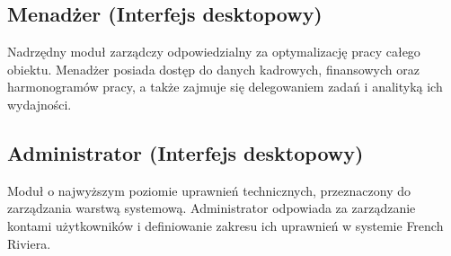 \subsection{Menadżer (Interfejs desktopowy)}
Nadrzędny moduł zarządczy odpowiedzialny za optymalizację pracy całego obiektu. Menadżer posiada dostęp do danych kadrowych, finansowych oraz harmonogramów pracy, a także zajmuje się delegowaniem zadań i analityką ich wydajności.

\subsection{Administrator (Interfejs desktopowy)}
Moduł o najwyższym poziomie uprawnień technicznych, przeznaczony do zarządzania warstwą systemową. Administrator odpowiada za zarządzanie kontami użytkowników i definiowanie zakresu ich uprawnień w systemie French Riviera.